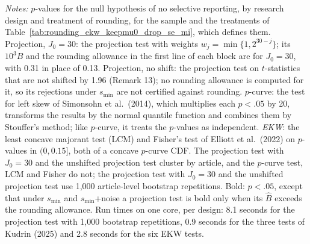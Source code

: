 \begin{table}[htbp]
\medskip
\begin{minipage}{\linewidth}
\footnotesize
\textit{Notes:} $p$-values for the null hypothesis of no selective reporting, by research design and treatment of rounding, for the sample and the treatments of Table~\ref{tab:rounding_ekw_keepmu0_drop_se_mi}, which defines them.
Projection, $J_0=30$: the projection test with weights $w_j=\min\{1,2^{30-j}\}$; its $10^3\widehat{B}$ and the rounding allowance in the first line of each block are for $J_0=30$, with 0.31 in place of 0.13.
Projection, no shift: the projection test on $t$-statistics that are not shifted by 1.96 (Remark 13); no rounding allowance is computed for it, so its rejections under $s_{\min}$ are not certified against rounding.
$p$-curve: the test for left skew of Simonsohn et al.\ (2014), which multiplies each $p<.05$ by 20, transforms the results by the normal quantile function and combines them by Stouffer's method; like $p$-curve, it treats the $p$-values as independent.
\textit{EKW}: the least concave majorant test (LCM) and Fisher's test of Elliott et al.\ (2022) on $p$-values in $(0,0.15]$, both of a concave $p$-curve CDF.
The projection test with $J_0=30$ and the unshifted projection test cluster by article, and the $p$-curve test, LCM and Fisher do not; the projection test with $J_0=30$ and the unshifted projection test use 1,000 article-level bootstrap repetitions.
Bold: $p<.05$, except that under $s_{\min}$ and $s_{\min}$+noise a projection test is bold only when its $\widehat{B}$ exceeds the rounding allowance.
Run times on one core, per design: 8.1 seconds for the projection test with 1,000 bootstrap repetitions, 0.9 seconds for the three tests of Kudrin (2025) and 2.8 seconds for the six EKW tests.
\end{minipage}
\end{table}
